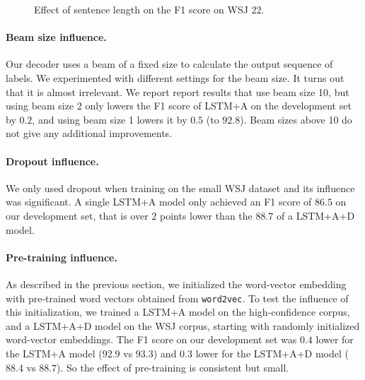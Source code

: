\documentclass{article} \usepackage{nips15submit_e,times}
\begin{document}
\begin{figure}[h]
 \caption{Effect of sentence length on the F1 score on WSJ 22.}
\label{fig:len}
\end{figure}

\paragraph{Beam size influence.}
Our decoder uses a beam of a fixed size to calculate the output sequence of
labels. We experimented with different settings for the beam size. It turns
out that it is almost irrelevant. We report report results that use beam size
10, but using beam size 2 only lowers the F1 score of LSTM+A on the
development set by $0.2$, and using beam size 1 lowers it by $0.5$
(to $92.8$). Beam sizes above 10 do not give any additional improvements.

\paragraph{Dropout influence.}
We only used dropout when training on the small WSJ dataset and its
influence was significant. A single LSTM+A model only achieved
an F1 score of $86.5$ on our development set, that is over $2$ points
lower than the $88.7$ of a LSTM+A+D model.

\paragraph{Pre-training influence.}
As described in the previous section, we initialized the word-vector
embedding with pre-trained word vectors obtained from \texttt{word2vec}.
To test the influence of this initialization, we trained a LSTM+A model
on the high-confidence corpus, and a LSTM+A+D model on the WSJ corpus,
starting with randomly initialized word-vector embeddings.
The F1 score on our development set was $0.4$ lower for the LSTM+A model
($92.9$ vs $93.3$) and $0.3$ lower for the LSTM+A+D model ($88.4$ vs $88.7$).
So the effect of pre-training is consistent but small.
\end{document}
